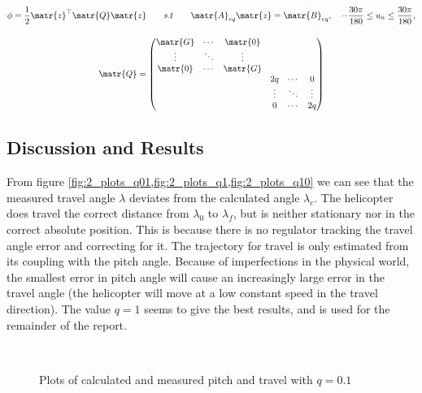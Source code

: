 \begin{subequations}\label{eq:qp_final}
    \begin{gather}
        \phi = \frac{1}{2}\matr{z}^\top\matr{Q}\matr{z}\qquad s.t\qquad \matr{A}_{eq}\matr{z} = \matr{B}_{eq},\quad -\frac{30\pi}{180} \leq u_{n} \leq \frac{30\pi}{180}, \\[0.4cm]
        \matr{Q}=
        \begin{pmatrix}
            \matr{G} & \cdots & \matr{0} & & & \\
            \vdots & \ddots & \vdots & &  & \\
            \matr{0} & \cdots & \matr{G} & & & \\
             & & & 2q & \cdots & 0 \\
             &  & & \vdots & \ddots & \vdots \\
             & & & 0 & \cdots & 2q
        \end{pmatrix}
    \end{gather}
\end{subequations}

\vspace{0.6cm}
\subsection{Discussion and Results}
From figure \cref{fig:2_plots_q01,fig:2_plots_q1,fig:2_plots_q10} we can see that the measured travel angle $\lambda$ deviates from the calculated angle $\lambda_c$. The helicopter does travel the correct distance from $\lambda_0$ to $\lambda_f$, but is neither stationary nor in the correct absolute position. This is because there is no regulator tracking the travel angle error and correcting for it. The trajectory for travel is only estimated from its coupling with the pitch angle. Because of imperfections in the physical world, the smallest error in pitch angle will cause an increasingly large error in the travel angle (the helicopter will move at a low constant speed in the travel direction). The value $q = 1$ seems to give the best results, and is used for the remainder of the report.

\begin{figure}
    \centering
    \begin{subfigure}[t]{0.5\textwidth}
        
        \label{fig:2_travel_q01}
    \end{subfigure}%
    ~
    \begin{subfigure}[t]{0.5\textwidth}
        
        \label{fig:2_pitch_q01}
    \end{subfigure}\vspace{-0.4cm}
    \caption{Plots of calculated and measured pitch and travel with $q = 0.1$}\label{fig:2_plots_q01}
\end{figure}

